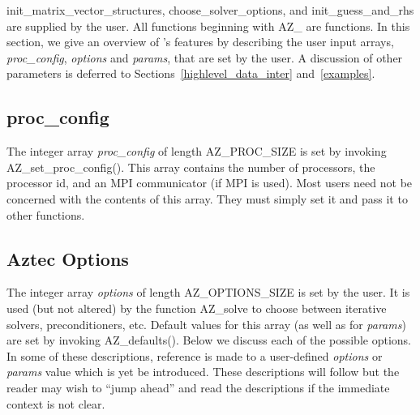 {\sf init\_matrix\_vector\_structures}, {\sf choose\_solver\_options}, and {\sf
  init\_guess\_and\_rhs} are supplied by the user.
All functions beginning with {\sf AZ\_} are \Az{} functions.
In this section, we give an overview of \Az{}'s features by describing the user
input arrays, {\it proc\_config}, {\it options\/} and {\it params\/}, that are set 
by the user.
A discussion of other parameters 
is deferred to Sections~\ref{highlevel_data_inter} and~\ref{examples}.

\subsection{proc\_config\label{proc_configI}}
The integer array {\it proc\_config} of length {\sf AZ\_PROC\_SIZE}
is set by invoking {\sf AZ\_set\_proc\_config()}. This array
contains the number of processors, the processor id, and an MPI communicator
(if MPI is used\cite{mpi}). Most users need not be concerned with the
contents of this 
array. They must simply set it and pass it to other \Az{} functions.

\subsection{Aztec Options\label{optionI}}

The integer array {\it options\/} of length {\sf AZ\_OPTIONS\_SIZE} is set by 
the
user. It is used (but not altered) by the function {\sf AZ\_solve} to choose
between iterative solvers, preconditioners, etc.  Default values for
this array (as well as for {\it params}) are set by invoking 
{\sf AZ\_defaults()}.
Below we discuss each of the
possible options.  In some of these descriptions, reference is made to a
user-defined {\it options\/} or {\it params\/} value which is yet be
introduced.  These descriptions will follow but the reader may wish to ``jump
ahead'' and read the descriptions if the immediate context is not clear.

